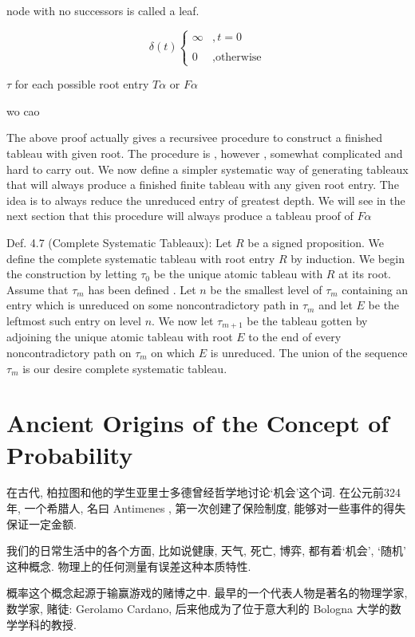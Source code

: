 \documentclass[a4paper, 10pt]{ctexbook} %
\begin{document}
node with no successors is called a leaf.

$$ \delta \left(t\right) \begin{cases} \infty & , t = 0 \\ \\ 0 & , \text{otherwise} \end{cases} $$


$\tau$ for each possible root entry $T\alpha$  or $F \alpha$

wo cao 

The above proof actually gives a recursivee procedure to construct a finished 
tableau with given root. The procedure is , however , somewhat complicated and hard
to carry out. We now define a simpler systematic way of generating tableaux that will
always produce a finished finite tableau with any given root entry. The idea is to 
always reduce the unreduced entry of greatest depth. We will see in the next section 
that this procedure will always produce a tableau proof of $F\alpha$


Def. 4.7 (Complete Systematic Tableaux):
Let $R$ be a signed proposition. We define the complete systematic tableau with root entry $R$ by 
induction. We begin the construction by letting $\tau_{0}$ be the unique atomic tableau with $R$ at 
its root. Assume that $\tau_{m}$ has been defined . Let $n$ be the smallest level of $\tau _{m}$ 
containing an entry which is unreduced on some noncontradictory path in $\tau_{m}$ and let $E$ be the leftmost such entry on 
level $n$. We now let $\tau_{m+1}$ be the tableau gotten by adjoining the unique 
atomic tableau with root $E$ to  the end of every noncontradictory path on $\tau_{m}$ 
on which $E$ is unreduced. The union of the sequence $\tau_{m}$ is our desire 
complete systematic tableau. 




\section{Ancient Origins of the Concept of Probability}
在古代, 柏拉图和他的学生亚里士多德曾经哲学地讨论`机会'这个词. 在公元前324年, 一个希腊人, 名曰 Antimenes , 第一次创建了保险制度, 能够对一些事件的得失保证一定金额. 

我们的日常生活中的各个方面, 比如说健康, 天气, 死亡, 博弈, 都有着`机会', `随机' 这种概念. 物理上的任何测量有误差这种本质特性. 

概率这个概念起源于输赢游戏的赌博之中. 最早的一个代表人物是著名的物理学家, 数学家, 赌徒: Gerolamo Cardano, 后来他成为了位于意大利的 Bologna 大学的数学学科的教授. 
\end{document}
